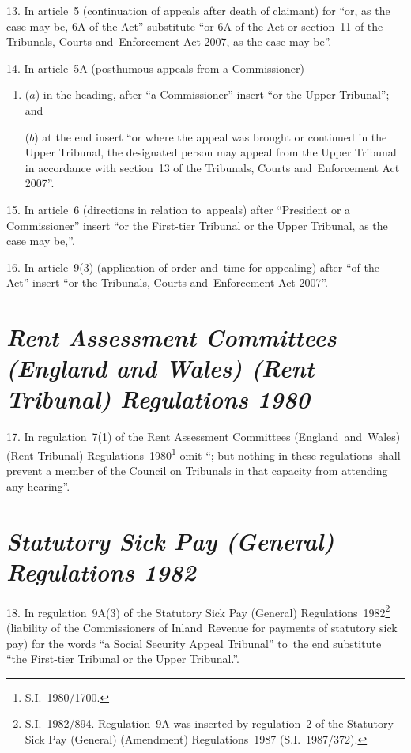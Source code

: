 \documentclass[12pt,a4paper]{article}
\begin{document}
\medskip

13.  In article~5 (continuation of appeals after death of claimant) for “or, as the case may be, 6A of the Act” substitute “or 6A of the Act or section~11 of the Tribunals, Courts and~Enforcement Act 2007, as the case may be”.

\medskip

14.  In article~5A (posthumous appeals from a Commissioner)—
\begin{enumerate}\item[]
($a$) in the heading, after “a Commissioner” insert “or the Upper Tribunal”; and

($b$) at the end insert “or where the appeal was brought or continued in the Upper Tribunal, the designated person may appeal from the Upper Tribunal in accordance with section~13 of the Tribunals, Courts and~Enforcement Act 2007”.
\end{enumerate}

\medskip

15.  In article~6 (directions in relation to~appeals) after “President or a Commissioner” insert “or the First-tier Tribunal or the Upper Tribunal, as the case may be,”.

\medskip

16.  In article~9(3) (application of order and~time for appealing) after “of the Act” insert “or the Tribunals, Courts and~Enforcement Act 2007”.

\section*{\itshape Rent Assessment Committees (England and Wales) (Rent Tribunal) Regulations 1980}

17.  In regulation~7(1) of the Rent Assessment Committees (England~and~Wales) (Rent Tribunal) Regulations~1980\footnote{S.I.~1980/1700.} omit “; but nothing in these regulations~shall prevent a member of the Council on Tribunals in that capacity from attending any hearing”.

\section*{\itshape\sloppy{} Statutory Sick Pay (General) Regulations 1982}

18.  In regulation~9A(3) of the Statutory Sick Pay (General) Regulations~1982\footnote{S.I.~1982/894. Regulation~9A was inserted by regulation~2 of the Statutory Sick Pay (General) (Amendment) Regulations~1987 (S.I.~1987/372).} (liability of the Commissioners of Inland~Revenue for payments of statutory sick pay) for the words “a Social Security Appeal Tribunal” to~the end substitute “the First-tier Tribunal or the Upper Tribunal.”.
\end{document}
